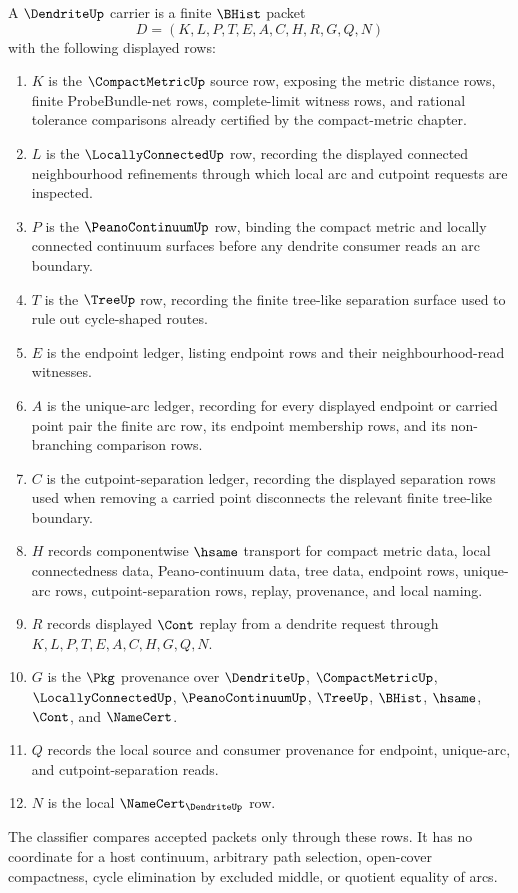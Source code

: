 \begin{definition}
\label{def:dendrite-carrier}
A $\DendriteUp$ carrier is a finite $\BHist$ packet
$$
D=(K,L,P,T,E,A,C,H,R,G,Q,N)
$$
with the following displayed rows:
\begin{enumerate}
\item $K$ is the $\CompactMetricUp$ source row, exposing the metric distance rows, finite ProbeBundle-net rows, complete-limit witness rows, and rational tolerance comparisons already certified by the compact-metric chapter.
\item $L$ is the $\LocallyConnectedUp$ row, recording the displayed connected neighbourhood refinements through which local arc and cutpoint requests are inspected.
\item $P$ is the $\PeanoContinuumUp$ row, binding the compact metric and locally connected continuum surfaces before any dendrite consumer reads an arc boundary.
\item $T$ is the $\TreeUp$ row, recording the finite tree-like separation surface used to rule out cycle-shaped routes.
\item $E$ is the endpoint ledger, listing endpoint rows and their neighbourhood-read witnesses.
\item $A$ is the unique-arc ledger, recording for every displayed endpoint or carried point pair the finite arc row, its endpoint membership rows, and its non-branching comparison rows.
\item $C$ is the cutpoint-separation ledger, recording the displayed separation rows used when removing a carried point disconnects the relevant finite tree-like boundary.
\item $H$ records componentwise $\hsame$ transport for compact metric data, local connectedness data, Peano-continuum data, tree data, endpoint rows, unique-arc rows, cutpoint-separation rows, replay, provenance, and local naming.
\item $R$ records displayed $\Cont$ replay from a dendrite request through $K,L,P,T,E,A,C,H,G,Q,N$.
\item $G$ is the $\Pkg$ provenance over $\DendriteUp$, $\CompactMetricUp$, $\LocallyConnectedUp$, $\PeanoContinuumUp$, $\TreeUp$, $\BHist$, $\hsame$, $\Cont$, and $\NameCert$.
\item $Q$ records the local source and consumer provenance for endpoint, unique-arc, and cutpoint-separation reads.
\item $N$ is the local $\NameCert_{\DendriteUp}$ row.
\end{enumerate}
The classifier compares accepted packets only through these rows. It has no coordinate for a host continuum, arbitrary path selection, open-cover compactness, cycle elimination by excluded middle, or quotient equality of arcs.
\end{definition}

